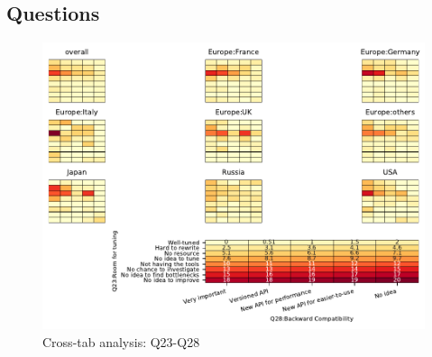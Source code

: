 
\subsection{Questions}


\begin{figure}
\begin{center}
\includegraphics[width=12cm]{../pdfs/Q23-Q28.pdf}
\caption{Cross-tab analysis: Q23-Q28}
\label{fig:Q23-Q28}
\end{center}
\end{figure}
